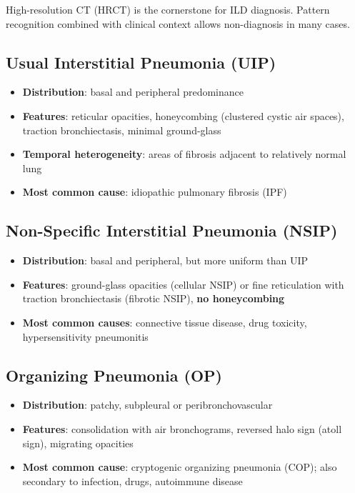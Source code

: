 High-resolution CT (HRCT) is the cornerstone for ILD diagnosis. Pattern recognition combined with clinical context allows non-diagnosis in many cases.

\subsection{Usual Interstitial Pneumonia (UIP)}
\begin{itemize}
  \item \textbf{Distribution}: basal and peripheral predominance
  \item \textbf{Features}: reticular opacities, honeycombing (clustered cystic air spaces), traction bronchiectasis, minimal ground-glass
  \item \textbf{Temporal heterogeneity}: areas of fibrosis adjacent to relatively normal lung
  \item \textbf{Most common cause}: idiopathic pulmonary fibrosis (IPF)
\end{itemize}

\subsection{Non-Specific Interstitial Pneumonia (NSIP)}
\begin{itemize}
  \item \textbf{Distribution}: basal and peripheral, but more uniform than UIP
  \item \textbf{Features}: ground-glass opacities (cellular NSIP) or fine reticulation with traction bronchiectasis (fibrotic NSIP), \textbf{no honeycombing}
  \item \textbf{Most common causes}: connective tissue disease, drug toxicity, hypersensitivity pneumonitis
\end{itemize}

\subsection{Organizing Pneumonia (OP)}
\begin{itemize}
  \item \textbf{Distribution}: patchy, subpleural or peribronchovascular
  \item \textbf{Features}: consolidation with air bronchograms, reversed halo sign (atoll sign), migrating opacities
  \item \textbf{Most common cause}: cryptogenic organizing pneumonia (COP); also secondary to infection, drugs, autoimmune disease
\end{itemize}

